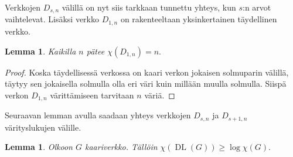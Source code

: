 \documentclass[finnish]{tktltiki2}
\newtheorem{lem}[lau]{Lemma}
\theoremstyle{definition}
\theoremstyle{remark}
\DeclareMathOperator{\DL}{DL}
\newcommand{\Dsn}{D_{s,n}}
\newcommand{\Dssn}{D_{s+1,n}}
\begin{document}

Verkkojen $\Dsn$ välillä on nyt siis tarkkaan tunnettu yhteys, kun $s$:n arvot
vaihtelevat. Lisäksi verkko $D_{1,n}$ on rakenteeltaan yksinkertainen
täydellinen verkko.

\begin{lem}
    Kaikilla $n$ pätee $\chi(D_{1,n}) = n.$
\end{lem}

\begin{proof}
    Koska täydellisessä verkossa on kaari verkon jokaisen solmuparin välillä,
    täytyy sen jokaisella solmulla olla eri väri kuin millään muulla solmulla.
    Siispä verkon $D_{1,n}$ värittämiseen tarvitaan $n$ väriä.
\end{proof}

Seuraavan lemman avulla saadaan yhteys verkkojen $\Dsn$ ja $\Dssn$
vä\-ri\-tys\-lu\-ku\-jen välille.

\newcommand{\DLG}{\DL(G)}

\begin{lem}
    Olkoon $G$ kaariverkko. Tällöin $\chi(\DLG) \geq \log \chi(G).$
\end{lem}
\end{document}
